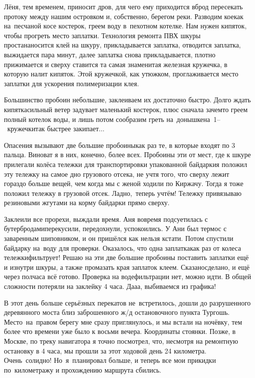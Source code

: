 Лёня, тем временем, приносит дров, для чего ему приходится вброд пересекать протоку между нашим островком и, собственно, берегом реки. Разводим кое\sdash как на~песчаной косе костерок, греем воду в~пехотном котелке. Нам нужен кипяток, чтобы прогреть место заплатки. Технология ремонта ПВХ шкуры проста\mdash наносится клей на шкуру, прикладывается заплатка, отводится заплатка, выжидается пара минут, далее заплатка снова прикладывается, плотно прижимается и сверху ставится та самая знаменитая железная кружечка, в которую налит кипяток. Этой кружечкой, как утюжком, проглаживается место заплатки для ускорения полимеризации клея. 

Большинство пробоин небольшие, заклеиваем их достаточно быстро. Долго ждать кипятка\mdash сильный ветер задувает маленький костерок, плюс сначала зачем\sdash то греем полный котелок воды, и лишь потом сообразим греть на~донышке\mdash на~1\thinspace--~кружечки\mdash так быстрее закипает$\ldots$

Опасения вызывают две большие пробоины\mdash как раз те, в которые входят по 3 пальца. Виноват я в них, конечно, более всех. Пробоины эти от мест, где к шкуре прилегали колёса тележки для транспортировки упакованной байдарки\mdash я положил эту тележку на самое дно грузового отсека, не учтя того, что сверху лежит гораздо больше вещей, чем когда мы с женой ходили по Киржачу. Тогда я тоже положил тележку в грузовой отсек. Ладно,~теперь учтём! Тележку привязываю резиновыми жгутами на корму байдарки прямо сверху. 

Заклеили все прорехи, выждали время. Аня вовремя подсуетилась с бутербродами\mdash перекусили, передохнули, успокоились. У Ани был термос с заваренным шиповником, и он пришёлся как нельзя кстати. Потом спустили байдарку на~воду для проверки. Оказалось, что одна заплатка\mdash как раз от колеса тележки\mdash фильтрует! Решаю на эти две большие пробоины поставить заплатки ещё и изнутри шкуры, а также промазать края заплаток клеем. Сказано\mdash сделано, и ещё через полчаса всё готово. Проверка на воде\mdash фильтрации нет, можно идти. В общей сложности потеряли на заклейку 4 часа. Да\sdash а\sdash а, выбиваемся из графика! 

В этот день больше серьёзных перекатов не~встретилось, дошли до разрушенного деревянного моста близ заброшенного ж/д остановочного пункта Тургошь. Место~на~правом берегу мне сразу приглянулось, и мы встали на ночёвку, тем более что времени уже было к восьми вечера. Координаты стоянки\mdash \CoordsLidFifteenTurgosch. Позже, в Москве, по треку навигатора я точно посмотрел, что, несмотря на ремонтную остановку в 4 часа, мы прошли за этот ходовой день 24 километра. Очень~солидно! Но~я~планировал больше, и теперь все мои прикидки по~километражу и прохождению маршрута сбились.
 
